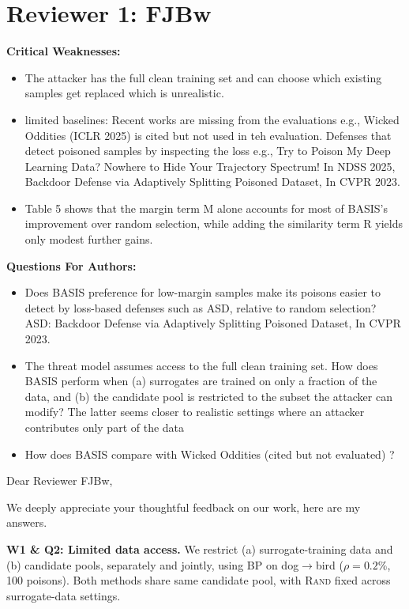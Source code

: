 

\section*{\Large{Reviewer 1: FJBw}}

\textbf{Critical Weaknesses:}
\begin{itemize}
    \item The attacker has the full clean training set and can choose which existing samples get replaced which is unrealistic.
    \item limited baselines: Recent works are missing from the evaluations e.g., Wicked Oddities (ICLR 2025) is cited but not used in teh evaluation. Defenses that detect poisoned samples by inspecting the loss e.g., Try to Poison My Deep Learning Data? Nowhere to Hide Your Trajectory Spectrum! In NDSS 2025, Backdoor Defense via Adaptively Splitting Poisoned Dataset, In CVPR 2023.
    \item Table 5 shows that the margin term M alone accounts for most of BASIS’s improvement over random selection, while adding the similarity term R yields only modest further gains.
\end{itemize}


\textbf{Questions For Authors:}

\begin{itemize}
    \item Does BASIS preference for low-margin samples make its poisons easier to detect by loss-based defenses such as ASD, relative to random selection? ASD: Backdoor Defense via Adaptively Splitting Poisoned Dataset, In CVPR 2023.
    \item The threat model assumes access to the full clean training set. How does BASIS perform when (a) surrogates are trained on only a fraction of the data, and (b) the candidate pool is restricted to the subset the attacker can modify? The latter seems closer to realistic settings where an attacker contributes only part of the data 
    \item How does BASIS compare with Wicked Oddities (cited but not evaluated) ?
\end{itemize}


Dear Reviewer FJBw,

We deeply appreciate your thoughtful feedback on our work, here are my answers.






\noindent\textbf{W1 \& Q2: Limited data access.}
We restrict (a) surrogate-training data and (b) candidate pools, separately and jointly, using BP on dog$\rightarrow$bird ($\rho=0.2\%$, 100 poisons). Both methods share same candidate pool, with \textsc{Rand} fixed across surrogate-data settings.


